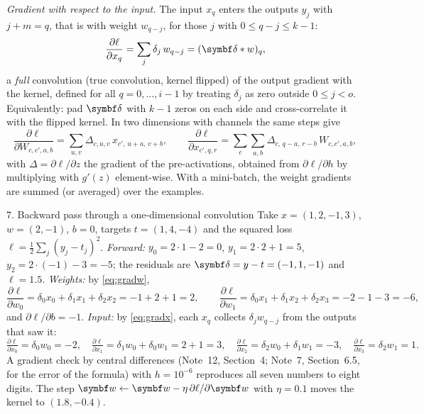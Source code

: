 \documentclass[11pt]{article}
\newcommand{\w}{\vect{w}}
\newcommand{\vdelta}{\vect{\delta}}
\begin{document}
\emph{Gradient with respect to the input.} The input $x_q$ enters the outputs $y_j$ with $j + m = q$, that is with weight
$w_{q-j}$, for those $j$ with $0 \le q - j \le k - 1$:
\begin{equation}\label{eq:gradx}
  \frac{\partial \ell}{\partial x_q} = \sum_j \delta_j\, w_{q-j} = (\vdelta * w)_q ,
\end{equation}
a \emph{full} convolution (true convolution, kernel flipped) of the output gradient with the kernel, defined for all
$q = 0, \dots, i - 1$ by treating $\delta_j$ as zero outside $0 \le j < o$. Equivalently: pad $\vdelta$ with $k - 1$ zeros
on each side and cross-correlate it with the flipped kernel. In two dimensions with channels the same steps give
\[
  \frac{\partial \ell}{\partial W_{c,c',a,b}} = \sum_{u,v} \Delta_{c,u,v}\, x_{c',\,u+a,\,v+b}, \qquad
  \frac{\partial \ell}{\partial x_{c',q,r}} = \sum_{c}\sum_{a,b} \Delta_{c,\,q-a,\,r-b}\, W_{c,c',a,b},
\]
with $\Delta = \partial \ell/\partial z$ the gradient of the pre-activations, obtained from $\partial \ell/\partial h$ by multiplying with
$g'(z)$ element-wise. With a mini-batch, the weight gradients are summed (or averaged) over the examples.

\begin{worked}{7. Backward pass through a one-dimensional convolution}
Take $x = (1, 2, -1, 3)$, $w = (2, -1)$, $b = 0$, targets $t = (1, 4, -4)$ and the squared loss
$\ell = \frac12\sum_j (y_j - t_j)^2$.
\emph{Forward:} $y_0 = 2 \cdot 1 - 2 = 0$, $y_1 = 2 \cdot 2 + 1 = 5$, $y_2 = 2 \cdot (-1) - 3 = -5$; the residuals are
$\vdelta = y - t = (-1, 1, -1)$ and $\ell = 1.5$.
\emph{Weights:} by \eqref{eq:gradw},
\[
  \frac{\partial \ell}{\partial w_0} = \delta_0x_0 + \delta_1x_1 + \delta_2x_2 = -1 + 2 + 1 = 2, \qquad
  \frac{\partial \ell}{\partial w_1} = \delta_0x_1 + \delta_1x_2 + \delta_2x_3 = -2 - 1 - 3 = -6,
\]
and $\partial \ell/\partial b = -1$.
\emph{Input:} by \eqref{eq:gradx}, each $x_q$ collects $\delta_jw_{q-j}$ from the outputs that saw it:
\[
  \tfrac{\partial \ell}{\partial x_0} = \delta_0w_0 = -2, \quad
  \tfrac{\partial \ell}{\partial x_1} = \delta_1w_0 + \delta_0w_1 = 2 + 1 = 3, \quad
  \tfrac{\partial \ell}{\partial x_2} = \delta_2w_0 + \delta_1w_1 = -3, \quad
  \tfrac{\partial \ell}{\partial x_3} = \delta_2w_1 = 1 .
\]
A gradient check by central differences (Note~12, Section~4; Note~7, Section~6.5, for the error of the formula) with
$h = 10^{-6}$ reproduces all seven numbers to eight digits. The step $\w \gets \w - \eta\,\partial \ell/\partial\w$ with $\eta = 0.1$ moves the kernel to $(1.8, -0.4)$.
\end{worked}
\end{document}
